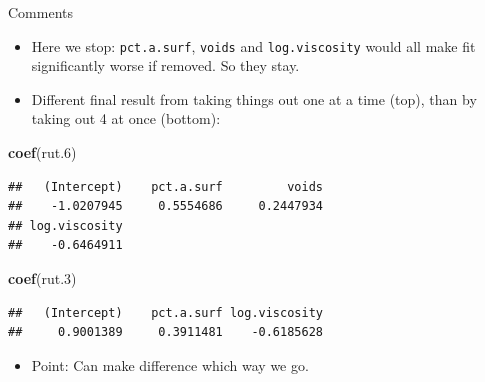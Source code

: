\documentclass[ignorenonframetext,]{beamer}
\newenvironment{Shaded}{\begin{snugshade}}{\end{snugshade}}
\newcommand{\FloatTok}[1]{\textcolor[rgb]{0.00,0.00,0.81}{#1}}
\newcommand{\KeywordTok}[1]{\textcolor[rgb]{0.13,0.29,0.53}{\textbf{#1}}}
\newcommand{\NormalTok}[1]{#1}
\providecommand{\tightlist}{%
  \setlength{\itemsep}{0pt}\setlength{\parskip}{0pt}}
\begin{document}
\begin{frame}[fragile]{Comments}
\protect\hypertarget{comments-18}{}

\begin{itemize}
\tightlist
\item
  Here we stop: \texttt{pct.a.surf}, \texttt{voids} and
  \texttt{log.viscosity} would all make fit significantly worse if
  removed. So they stay.
\item
  Different final result from taking things out one at a time (top),
  than by taking out 4 at once (bottom):
\end{itemize}

\begin{Shaded}
\begin{Highlighting}[]
\KeywordTok{coef}\NormalTok{(rut}\FloatTok{.6}\NormalTok{)}
\end{Highlighting}
\end{Shaded}

\begin{verbatim}
##   (Intercept)    pct.a.surf         voids 
##    -1.0207945     0.5554686     0.2447934 
## log.viscosity 
##    -0.6464911
\end{verbatim}

\begin{Shaded}
\begin{Highlighting}[]
\KeywordTok{coef}\NormalTok{(rut}\FloatTok{.3}\NormalTok{)}
\end{Highlighting}
\end{Shaded}

\begin{verbatim}
##   (Intercept)    pct.a.surf log.viscosity 
##     0.9001389     0.3911481    -0.6185628
\end{verbatim}

\begin{itemize}
\tightlist
\item
  Point: Can make difference which way we go.
\end{itemize}

\end{frame}
\end{document}
